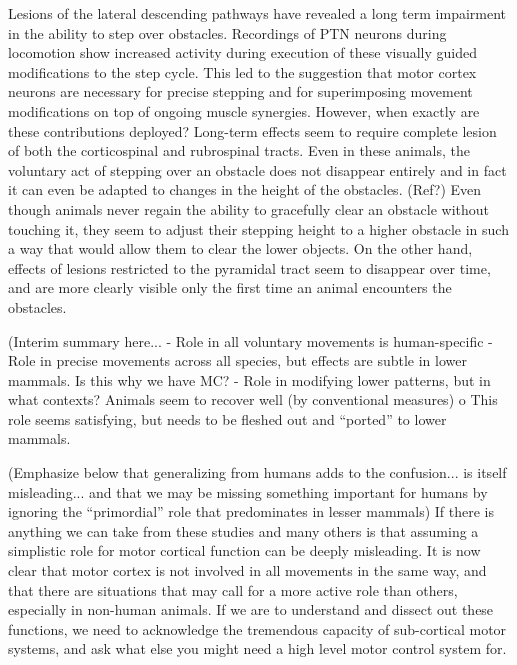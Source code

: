Lesions of the lateral descending pathways have revealed a long term impairment in the ability to step over obstacles. Recordings of PTN neurons during locomotion show increased activity during execution of these visually guided modifications to the step cycle. This led to the suggestion that motor cortex neurons are necessary for precise stepping and for superimposing movement modifications on top of ongoing muscle synergies. However, when exactly are these contributions deployed? Long-term effects seem to require complete lesion of both the corticospinal and rubrospinal tracts. Even in these animals, the voluntary act of stepping over an obstacle does not disappear entirely and in fact it can even be adapted to changes in the height of the obstacles. (Ref?) Even though animals never regain the ability to gracefully clear an obstacle without touching it, they seem to adjust their stepping height to a higher obstacle in such a way that would allow them to clear the lower objects. On the other hand, effects of lesions restricted to the pyramidal tract seem to disappear over time, and are more clearly visible only the first time an animal encounters the obstacles.


 

(Interim summary here...
- Role in all voluntary movements is human-specific
- Role in precise movements across all species, but effects are subtle in lower mammals. Is this why we have MC?
- Role in modifying lower patterns, but in what contexts? Animals seem to recover well (by conventional measures)
o This role seems satisfying, but needs to be fleshed out and ``ported'' to lower mammals.


(Emphasize below that generalizing from humans adds to the confusion... is itself misleading... and that we may be missing something important for humans by ignoring the ``primordial'' role that predominates in lesser mammals)
If there is anything we can take from these studies and many others is that assuming a simplistic role for motor cortical function can be deeply misleading. It is now clear that motor cortex is not involved in all movements in the same way, and that there are situations that may call for a more active role than others, especially in non-human animals. If we are to understand and dissect out these functions, we need to acknowledge the tremendous capacity of sub-cortical motor systems, and ask what else you might need a high level motor control system for.

